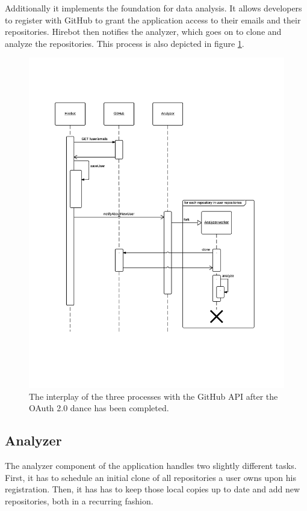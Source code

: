 Additionally it implements the foundation for data analysis. It allows developers to register with GitHub to grant the application access to their emails and their repositories. Hirebot then notifies the analyzer, which goes on to clone and analyze the repositories. This process is also depicted in figure \ref{fig:regprocess}.

\begin{figure}[ht]
  \centering
  \includegraphics[width=35em]{gfx/registersequence.png}
  \caption{The interplay of the three processes with the GitHub API after the OAuth 2.0 dance has been completed.}
  \label{fig:regprocess}
\end{figure}

\subsection{Analyzer}
The analyzer component of the application handles two slightly different
tasks. First, it has to schedule an initial clone of all repositories
a user owns upon his registration. Then, it has has to keep those local
copies up to date and add new repositories, both in a recurring fashion.


